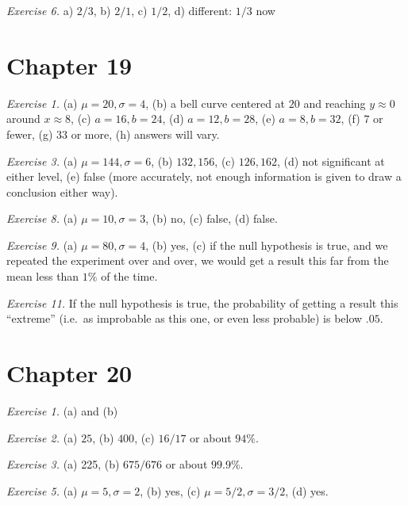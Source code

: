 \documentclass[justified]{tufte-book}
\begin{document}
\vspace{.5em}

\noindent
\emph{Exercise 6.} a) \(2/3\), b) \(2/1\), c) \(1/2\), d) different: \(1/3\) now

\hypertarget{chapter-19}{%
\section*{Chapter 19}\label{chapter-19}}

\noindent
\emph{Exercise 1.}
(a) \(\mu = 20, \sigma = 4\),
(b) a bell curve centered at \(20\) and reaching \(y \approx 0\) around \(x \approx 8\),
(c) \(a = 16, b = 24\),
(d) \(a = 12, b = 28\),
(e) \(a = 8, b = 32\),
(f) \(7\) or fewer,
(g) \(33\) or more,
(h) answers will vary.

\vspace{.5em}

\noindent
\emph{Exercise 3.}
(a) \(\mu = 144, \sigma = 6\),
(b) \(132, 156\),
(c) \(126, 162\),
(d) not significant at either level,
(e) false (more accurately, not enough information is given to draw a conclusion either way).

\vspace{.5em}

\noindent
\emph{Exercise 8.}
(a) \(\mu = 10, \sigma = 3\),
(b) no,
(c) false,
(d) false.

\vspace{.5em}

\noindent
\emph{Exercise 9.}
(a) \(\mu = 80, \sigma = 4\),
(b) yes,
(c) if the null hypothesis is true, and we repeated the experiment over and over, we would get a result this far from the mean less than \(1\%\) of the time.

\vspace{.5em}

\noindent
\emph{Exercise 11.} If the null hypothesis is true, the probability of getting a result this ``extreme'' (i.e.~as improbable as this one, or even less probable) is below \(.05\).

\hypertarget{chapter-20}{%
\section*{Chapter 20}\label{chapter-20}}

\noindent
\emph{Exercise 1.} (a) and (b)

\vspace{.5em}

\noindent
\emph{Exercise 2.} (a) \(25\), (b) \(400\), (c) \(16/17\) or about \(94\%\).

\vspace{.5em}

\noindent
\emph{Exercise 3.} (a) 225, (b) \(675/676\) or about \(99.9\%\).

\vspace{.5em}

\noindent
\emph{Exercise 5.} (a) \(\mu = 5, \sigma = 2\), (b) yes, (c) \(\mu = 5/2, \sigma = 3/2\), (d) yes.
\end{document}
